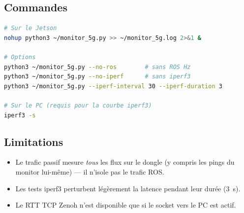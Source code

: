 \documentclass[a4paper,12pt]{article}
\begin{document}
\subsection{Commandes}
\begin{lstlisting}[language=bash]
# Sur le Jetson
nohup python3 ~/monitor_5g.py >> ~/monitor_5g.log 2>&1 &

# Options
python3 ~/monitor_5g.py --no-ros        # sans ROS Hz
python3 ~/monitor_5g.py --no-iperf      # sans iperf3
python3 ~/monitor_5g.py --iperf-interval 30 --iperf-duration 3

# Sur le PC (requis pour la courbe iperf3)
iperf3 -s
\end{lstlisting}

\subsection{Limitations}
\begin{itemize}
  \item Le trafic passif mesure \emph{tous} les flux sur le dongle (y compris les pings
        du monitor lui-même) — il n'isole pas le trafic ROS.
  \item Les tests iperf3 perturbent légèrement la latence pendant leur durée (3~s).
  \item Le RTT TCP Zenoh n'est disponible que si le socket vers le PC est actif.
\end{itemize}
\end{document}
